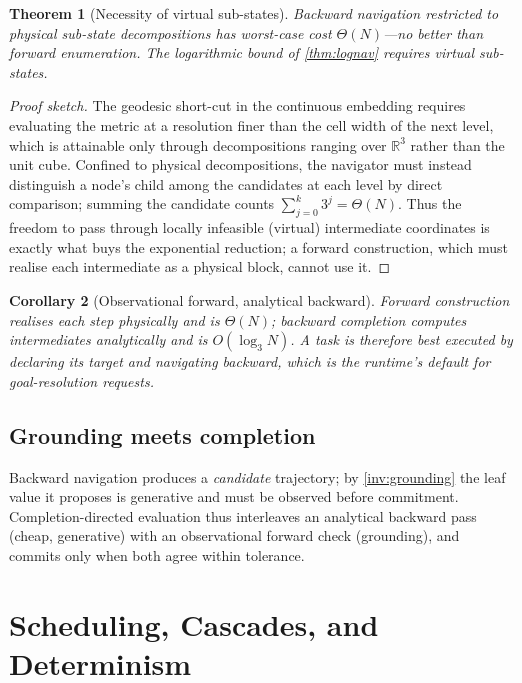 \documentclass[11pt,a4paper]{article}
\theoremstyle{plain}
\newtheorem{theorem}{Theorem}[section]
\newtheorem{corollary}[theorem]{Corollary}
\theoremstyle{definition}
\theoremstyle{remark}
\newcommand{\R}{\mathbb{R}}
\begin{document}
\begin{theorem}[Necessity of virtual sub-states]
\label{thm:necessity}
Backward navigation restricted to \emph{physical} sub-state decompositions has
worst-case cost $\Theta(N)$---no better than forward enumeration. The
logarithmic bound of \cref{thm:lognav} requires virtual sub-states.
\end{theorem}
\begin{proof}[Proof sketch]
The geodesic short-cut in the continuous embedding requires evaluating the
metric at a resolution finer than the cell width of the next level, which is
attainable only through decompositions ranging over $\R^{3}$ rather than the
unit cube. Confined to physical decompositions, the navigator must instead
distinguish a node's child among the candidates at each level by direct
comparison; summing the candidate counts $\sum_{j=0}^{k}3^{j}=\Theta(N)$. Thus
the freedom to pass through locally infeasible (virtual) intermediate
coordinates is exactly what buys the exponential reduction; a forward
construction, which must realise each intermediate as a physical block, cannot
use it.
\end{proof}

\begin{corollary}[Observational forward, analytical backward]
\label{cor:asymmetry}
Forward construction realises each step physically and is $\Theta(N)$; backward
completion computes intermediates analytically and is $O(\log_3 N)$. A task is
therefore best executed by declaring its target and navigating backward, which
is the runtime's default for goal-resolution requests.
\end{corollary}

\subsection{Grounding meets completion}

Backward navigation produces a \emph{candidate} trajectory; by
\cref{inv:grounding} the leaf value it proposes is generative and must be observed before
commitment. Completion-directed evaluation thus interleaves an analytical
backward pass (cheap, generative) with an observational forward check
(grounding), and commits only when both agree within tolerance.

\section{Scheduling, Cascades, and Determinism}
\label{sec:scheduler}
\end{document}
